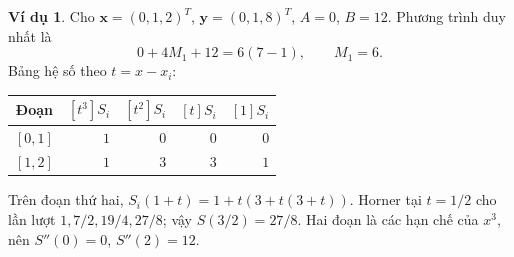 \documentclass[12pt,a4paper,oneside]{book}
\numberwithin{algorithm}{chapter}
\theoremstyle{definition}
\newtheorem{vidu}{Ví dụ}[chapter]
\begin{document}
\begin{vidu}
Cho $\boldsymbol x=(0,1,2)^T$, $\boldsymbol y=(0,1,8)^T$, $A=0$, $B=12$. Phương trình duy nhất là
\[
 0+4M_1+12=6(7-1),\qquad M_1=6.
\]
Bảng hệ số theo $t=x-x_i$:
\begin{center}
\begin{tabular}{c|rrrr}\toprule
Đoạn&$[t^3]S_i$&$[t^2]S_i$&$[t]S_i$&$[1]S_i$\\\midrule
$[0,1]$&$1$&$0$&$0$&$0$\\
$[1,2]$&$1$&$3$&$3$&$1$\\\bottomrule
\end{tabular}
\end{center}
Trên đoạn thứ hai, $S_i(1+t)=1+t(3+t(3+t))$. Horner tại $t=1/2$ cho lần lượt $1,7/2,19/4,27/8$; vậy $S(3/2)=27/8$. Hai đoạn là các hạn chế của $x^3$, nên $S''(0)=0$, $S''(2)=12$.
\end{vidu}
\end{document}
